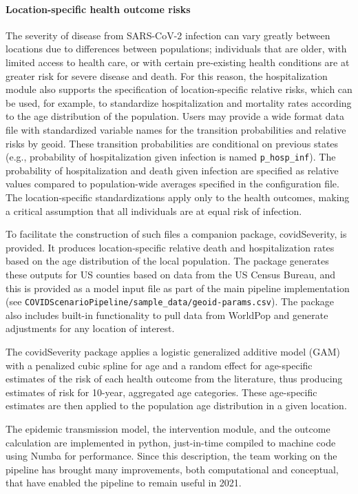 {\paragraph{Location-specific health outcome risks}
The severity of disease from SARS-CoV-2 infection can vary greatly between locations due to differences between populations; individuals that are older, with limited access to health care, or with certain pre-existing health conditions are at greater risk for severe disease and death. For this reason, the hospitalization module also supports the specification of location-specific relative risks, which can be used, for example, to standardize hospitalization and mortality rates according to the age distribution of the population. Users may provide a wide format data file with standardized variable names for the transition probabilities and relative risks by geoid. These transition probabilities are conditional on previous states (e.g., probability of hospitalization given infection is named \verb|p_hosp_inf|). The probability of hospitalization and death given infection are specified as relative values compared to population-wide averages specified in the configuration file. The location-specific standardizations apply only to the health outcomes, making a critical assumption that all individuals are at equal risk of infection.

To facilitate the construction of such files a companion package, covidSeverity\cite{Lauer:HopkinsIDDCovidSeverityInitial:2020}, is provided. It produces location-specific relative death and hospitalization rates based on the age distribution of the local population. The package generates these outputs for US counties based on data from the US Census Bureau, and this is provided as a model input file as part of the main pipeline implementation (see \verb|COVIDScenarioPipeline/sample_data/geoid-params.csv|). The package also includes built-in functionality to pull data from WorldPop and generate adjustments for any location of interest.%

The covidSeverity package applies a logistic generalized additive model (GAM) with a penalized cubic spline for age and a random effect for age-specific estimates of the risk of each health outcome from the literature, thus producing estimates of risk for 10-year, aggregated age categories. These age-specific estimates are then applied to the population age distribution in a given location.

The epidemic transmission model, the intervention module, and the outcome calculation are implemented in python, just-in-time compiled to machine code using Numba\cite{Lam:NumbaLLVMbasedPython:2015} for performance. Since this description, the team working on the pipeline has brought many improvements, both computational and conceptual, that have enabled the pipeline to remain useful in 2021.

}

